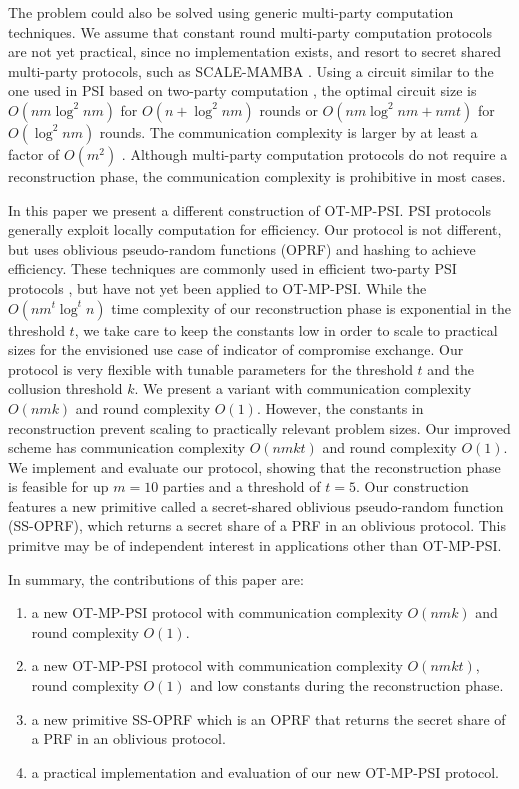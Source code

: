 \documentclass[10pt, sigconf]{acmart}
\begin{document}
The problem could also be solved using generic multi-party computation techniques.
We assume that constant round multi-party computation protocols \cite{lindell2019efficient,lindell2016more} are not yet practical, since no implementation exists, and resort to secret shared multi-party protocols, such as SCALE-MAMBA \cite{aly2020scale}.
Using a circuit similar to the one used in PSI based on two-party computation \cite{huang12private}, the optimal circuit size is $O(nm \log^2 nm)$ for $O(n + \log^2 nm)$ rounds or $O(nm \log^2 nm + nmt)$ for $O(\log^2 nm)$ rounds.
The communication complexity is larger by at least a factor of $O(m^2)$ \cite{damgaard2019communication}.
Although multi-party computation protocols do not require a reconstruction phase, the communication complexity is prohibitive in most cases.

In this paper we present a different construction of OT-MP-PSI.
PSI protocols generally exploit locally computation for efficiency.
Our protocol is not different, but uses oblivious pseudo-random functions (OPRF) and hashing to achieve efficiency.
These techniques are commonly used in efficient two-party PSI protocols \cite{Freedman2016,Kolesnikov,Pinkas}, but have not yet been applied to OT-MP-PSI.
While the $O(n m^t \log^t n)$ time complexity of our reconstruction phase is exponential in the threshold $t$, we take care to keep the constants low in order to scale to practical sizes for the envisioned use case of indicator of compromise exchange.
Our protocol is very flexible with tunable parameters for the threshold $t$ and the collusion threshold $k$.
We present a variant with communication complexity $O(nmk)$ and round complexity $O(1)$.
However, the constants in reconstruction prevent scaling to practically relevant problem sizes.
Our improved scheme has communication complexity $O(nmkt)$ and round complexity $O(1)$.
We implement and evaluate our protocol, showing that the reconstruction phase is feasible for up $m = 10$ parties and a threshold of $t = 5$.
Our construction features a new primitive called a secret-shared oblivious pseudo-random function (SS-OPRF), which returns a secret share of a PRF in an oblivious protocol.
This primitve may be of independent interest in applications other than OT-MP-PSI.

In summary, the contributions of this paper are:

\begin{enumerate}

\item a new OT-MP-PSI protocol with communication complexity $O(nmk)$ and round complexity $O(1)$.

\item a new OT-MP-PSI protocol with communication complexity $O(nmkt)$, round complexity $O(1)$ and low constants during the reconstruction phase.

\item a new primitive SS-OPRF which is an OPRF that returns the secret share of a PRF in an oblivious protocol.

\item a practical implementation and evaluation of our new OT-MP-PSI protocol.

\end{enumerate}
\end{document}
